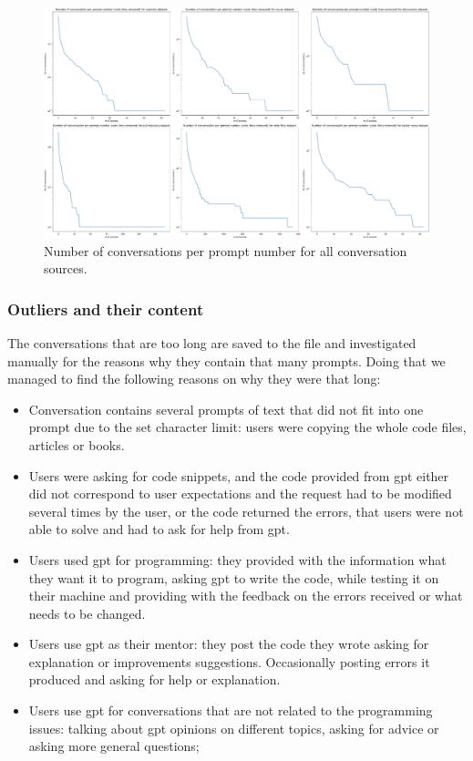\begin{figure}[H]
    \centering
    \includegraphics[width=\textwidth]{imgs/conv-per-prompt-nr.png}
    \caption{Number of conversations per prompt number for all conversation sources.}
    \label{fig:conv-per-prompt}
\end{figure}

\subsubsection{Outliers and their content}
The conversations that are too long are saved to the file and investigated manually for the reasons why they contain that many prompts. Doing that we managed to find the following reasons on why they were that long:
\begin{itemize}
    \item Conversation contains several prompts of text that did not fit into one prompt due to the set character limit: users were copying the whole code files, articles or books.
    \item Users were asking for code snippets, and the code provided from \gls{gpt} either did not correspond to user expectations and the request had to be modified several times by the user, or the code returned the errors, that users were not able to solve and had to ask for help from \gls{gpt}.
    \item Users used \gls{gpt} for programming: they provided with the information what they want it to program, asking \gls{gpt} to write the code, while testing it on their machine and providing with the feedback on the errors received or what needs to be changed.
    \item Users use \gls{gpt} as their mentor: they post the code they wrote asking for explanation or improvements suggestions. Occasionally posting errors it produced and asking for help or explanation.
    \item Users use \gls{gpt} for conversations that are not related to the programming issues: talking about \gls{gpt} opinions on different topics, asking for advice or asking more general questions; 
\end{itemize}


